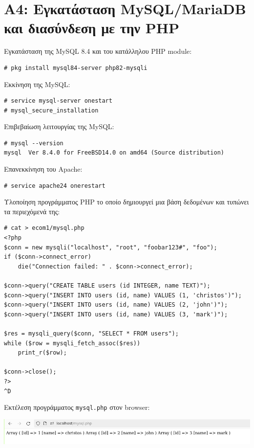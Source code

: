 \documentclass[12pt]{article}
\begin{document}
\section{Α4: Εγκατάσταση MySQL/MariaDB και διασύνδεση με την PHP}

Εγκατάσταση της MySQL 8.4 και του κατάλληλου PHP module:

\begin{lstlisting}
# pkg install mysql84-server php82-mysqli
\end{lstlisting}

Εκκίνηση της MySQL:

\begin{lstlisting}
# service mysql-server onestart
# mysql_secure_installation
\end{lstlisting}

Επιβεβαίωση λειτουργίας της MySQL:

\begin{lstlisting}
# mysql --version
mysql  Ver 8.4.0 for FreeBSD14.0 on amd64 (Source distribution)
\end{lstlisting}

Επανεκκίνηση του Apache:

\begin{lstlisting}
# service apache24 onerestart
\end{lstlisting}

Υλοποίηση προγράμματος PHP το οποίο δημιουργεί μια βάση δεδομένων και τυπώνει
τα περιεχόμενά της:

\begin{lstlisting}
# cat > ecom1/mysql.php
<?php
$conn = new mysqli("localhost", "root", "foobar123#", "foo");
if ($conn->connect_error)
	die("Connection failed: " . $conn->connect_error);

$conn->query("CREATE TABLE users (id INTEGER, name TEXT)");
$conn->query("INSERT INTO users (id, name) VALUES (1, 'christos')");
$conn->query("INSERT INTO users (id, name) VALUES (2, 'john')");
$conn->query("INSERT INTO users (id, name) VALUES (3, 'mark')");

$res = mysqli_query($conn, "SELECT * FROM users");
while ($row = mysqli_fetch_assoc($res))
	print_r($row);

$conn->close();
?>
^D
\end{lstlisting}

Εκτέλεση προγράμματος \lstinline{mysql.php} στον browser:

\includegraphics[width=\textwidth]{res/mysql.png} \\
\end{document}
